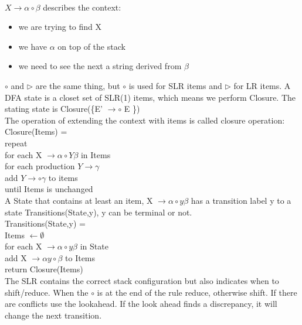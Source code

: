 \documentclass[12pt]{article}
\begin{document}
\\ $X \rightarrow \alpha \circ \beta$ describes the context: 
\begin{itemize}
    \item we are trying to find X 
    \item we have $\alpha$ on top of the stack
    \item we need to see the next a string derived from $\beta$
\end{itemize}
$\circ$ and $\triangleright$ are the same thing, but $\circ$ is used for SLR items and $\triangleright$ for LR items. A DFA state is a closet set of SLR(1) items, which means we perform Closure. The stating state is Closure(\{E' $\rightarrow \circ$ E \})
\\ The operation of extending the context with items is called closure operation: 
\\ Closure(Items) =
\\ \hspace*{4mm} repeat 
\\ \hspace*{8mm} for each X $\rightarrow \alpha \circ Y \beta$ in Items 
\\ \hspace*{12mm} for each production $Y \rightarrow \gamma$
\\ \hspace*{16mm} add $Y \rightarrow \circ \gamma$ to items
\\ until Items is unchanged
\vspace{2mm} 
\\ A State that contains at least an item, X $\rightarrow \alpha \circ y \beta$ has a transition label y to a state Transitions(State,y), y can be terminal or not.
\\ Transitions(State,y) = 
\\ \hspace*{4mm} Items $\leftarrow \emptyset$
\\ \hspace*{4mm} for each X $\rightarrow \alpha \circ y \beta$ in State
\\ \hspace*{8mm} add X $\rightarrow \alpha y \circ \beta$ to Items
\\ \hspace*{4mm} return Closure(Items)
\\ The SLR contains the correct stack configuration but also indicates when to shift/reduce. When the $\circ$ is at the end of the rule reduce, otherwise shift. If there are conflicts use the lookahead. If the look ahead finds a discrepancy, it will change the next transition. 
\end{document}
